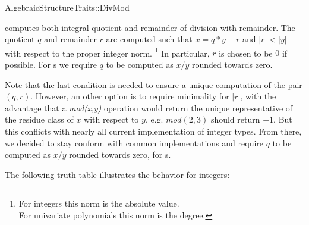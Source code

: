 \begin{ccRefConcept}{AlgebraicStructureTraits::DivMod}

\ccDefinition

 computes both integral quotient and remainder
of division with remainder. The quotient $q$ and remainder $r$ are computed 
such that $x = q*y + r$ and $|r| < |y|$ with respect to the proper integer norm.
\footnote{
For integers this norm is the absolute value.\\ 
For univariate polynomials this norm is the degree.} 
In particular, $r$ is chosen to be $0$ if possible.
For  s we require $q$ to be computed 
as $x/y$ rounded towards zero. 

Note that the last condition is needed to ensure a unique computation of the 
pair $(q,r)$. However, an other option is to require minimality for $|r|$, 
with the advantage that
a {\em mod(x,y)} operation would return the unique representative of the 
residue class of $x$ with respect to $y$, e.g. $mod(2,3)$ should return $-1$. 
But this conflicts with nearly all current implementation 
of integer types. From there, we decided to stay conform with common 
implementations and require $q$ to be computed as $x/y$ rounded towards zero, 
for  s. 


The following truth table illustrates the behavior for integers: 


\end{ccRefConcept}
